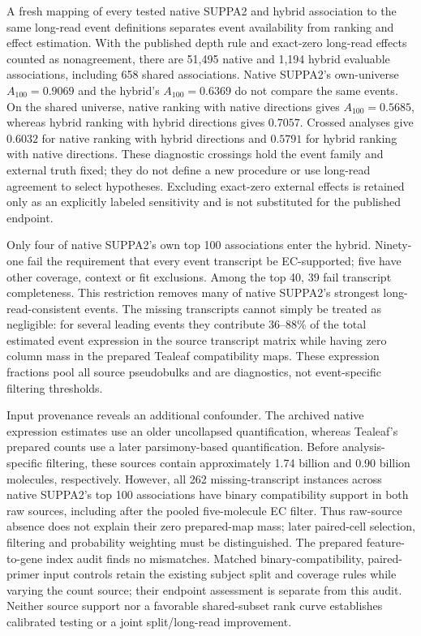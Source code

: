 \documentclass[11pt]{article}
\begin{document}
A fresh mapping of every tested native SUPPA2 and hybrid association to the same long-read event definitions separates event availability from ranking and effect estimation. With the published depth rule and exact-zero long-read effects counted as nonagreement, there are 51,495 native and 1,194 hybrid evaluable associations, including 658 shared associations. Native SUPPA2's own-universe \(A_{100}=0.9069\) and the hybrid's \(A_{100}=0.6369\) do not compare the same events. On the shared universe, native ranking with native directions gives \(A_{100}=0.5685\), whereas hybrid ranking with hybrid directions gives \(0.7057\). Crossed analyses give \(0.6032\) for native ranking with hybrid directions and \(0.5791\) for hybrid ranking with native directions. These diagnostic crossings hold the event family and external truth fixed; they do not define a new procedure or use long-read agreement to select hypotheses. Excluding exact-zero external effects is retained only as an explicitly labeled sensitivity and is not substituted for the published endpoint.

Only four of native SUPPA2's own top 100 associations enter the hybrid. Ninety-one fail the requirement that every event transcript be EC-supported; five have other coverage, context or fit exclusions. Among the top 40, 39 fail transcript completeness. This restriction removes many of native SUPPA2's strongest long-read-consistent events. The missing transcripts cannot simply be treated as negligible: for several leading events they contribute 36--88\% of the total estimated event expression in the source transcript matrix while having zero column mass in the prepared Tealeaf compatibility maps. These expression fractions pool all source pseudobulks and are diagnostics, not event-specific filtering thresholds.

Input provenance reveals an additional confounder. The archived native expression estimates use an older uncollapsed quantification, whereas Tealeaf's prepared counts use a later parsimony-based quantification. Before analysis-specific filtering, these sources contain approximately 1.74 billion and 0.90 billion molecules, respectively. However, all 262 missing-transcript instances across native SUPPA2's top 100 associations have binary compatibility support in both raw sources, including after the pooled five-molecule EC filter. Thus raw-source absence does not explain their zero prepared-map mass; later paired-cell selection, filtering and probability weighting must be distinguished. The prepared feature-to-gene index audit finds no mismatches. Matched binary-compatibility, paired-primer input controls retain the existing subject split and coverage rules while varying the count source; their endpoint assessment is separate from this audit. Neither source support nor a favorable shared-subset rank curve establishes calibrated testing or a joint split/long-read improvement.
\end{document}
